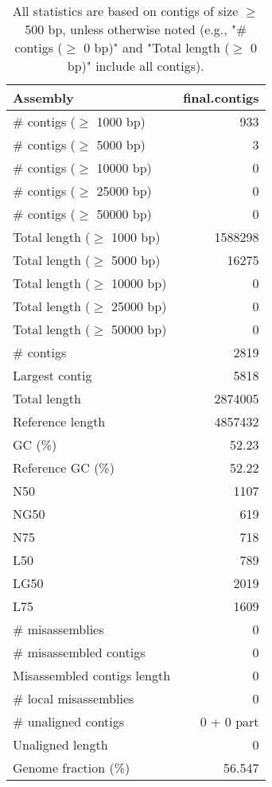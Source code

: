 \documentclass[12pt,a4paper]{article}
\begin{document}
\begin{table}[ht]
\begin{center}
\caption{All statistics are based on contigs of size $\geq$ 500 bp, unless otherwise noted (e.g., "\# contigs ($\geq$ 0 bp)" and "Total length ($\geq$ 0 bp)" include all contigs).}
\begin{tabular}{|l*{1}{|r}|}
\hline
Assembly & final.contigs \\ \hline
\# contigs ($\geq$ 1000 bp) & 933 \\ \hline
\# contigs ($\geq$ 5000 bp) & 3 \\ \hline
\# contigs ($\geq$ 10000 bp) & 0 \\ \hline
\# contigs ($\geq$ 25000 bp) & 0 \\ \hline
\# contigs ($\geq$ 50000 bp) & 0 \\ \hline
Total length ($\geq$ 1000 bp) & 1588298 \\ \hline
Total length ($\geq$ 5000 bp) & 16275 \\ \hline
Total length ($\geq$ 10000 bp) & 0 \\ \hline
Total length ($\geq$ 25000 bp) & 0 \\ \hline
Total length ($\geq$ 50000 bp) & 0 \\ \hline
\# contigs & 2819 \\ \hline
Largest contig & 5818 \\ \hline
Total length & 2874005 \\ \hline
Reference length & 4857432 \\ \hline
GC (\%) & 52.23 \\ \hline
Reference GC (\%) & 52.22 \\ \hline
N50 & 1107 \\ \hline
NG50 & 619 \\ \hline
N75 & 718 \\ \hline
L50 & 789 \\ \hline
LG50 & 2019 \\ \hline
L75 & 1609 \\ \hline
\# misassemblies & 0 \\ \hline
\# misassembled contigs & 0 \\ \hline
Misassembled contigs length & 0 \\ \hline
\# local misassemblies & 0 \\ \hline
\# unaligned contigs & 0 + 0 part \\ \hline
Unaligned length & 0 \\ \hline
Genome fraction (\%) & 56.547 \\ \hline

\end{tabular}
\end{center}
\end{table}
\end{document}
